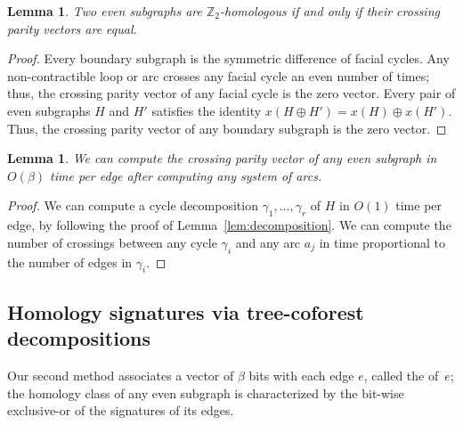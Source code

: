 \documentclass[11pt,twoside]{article}
\def\Z{\mathbb{Z}}
\newtheorem{lemma}[theorem]{Lemma}
\begin{document}
\begin{lemma}
Two even subgraphs are $\Z_2$-homologous if and only if their crossing parity vectors are equal.
\end{lemma}

\begin{proof}
Every boundary subgraph is the symmetric difference of facial cycles.  Any non-contractible loop or arc crosses any facial cycle an even number of times; thus, the crossing parity vector of any facial cycle is the zero vector.  Every pair of even subgraphs $H$ and $H'$ satisfies the identity $x(H\oplus H') = x(H) \oplus x(H')$.  Thus, the crossing parity vector of any boundary subgraph is the zero vector.
\end{proof}

\begin{lemma}
We can compute the crossing parity vector of any even subgraph in $O(\beta)$ time per edge after computing any system of arcs.
\end{lemma}

\begin{proof}
We can compute a cycle decomposition $\gamma_1, \dots, \gamma_r$ of $H$ in $O(1)$ time per edge, by following the proof of Lemma~\ref{lem:decomposition}.
We can compute the number of crossings between any cycle $\gamma_i$ and any arc $a_j$ in time proportional to the number of edges in $\gamma_i$.
\end{proof}



\subsection{Homology signatures via tree-coforest decompositions}
\label{sec:characterizing_signatures}

Our second method associates a vector of $\beta$ bits with each edge $e$, called the  of~$e$; the homology class of any even subgraph is characterized by the bit-wise exclusive-or of the signatures of its edges.
\end{document}
